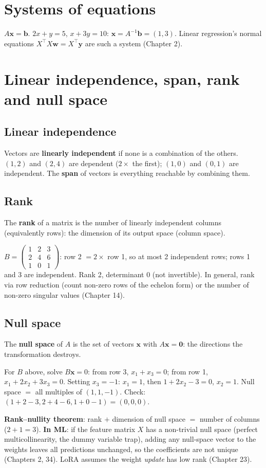 \section{Systems of equations}
$A\mathbf x = \mathbf b$. $2x + y = 5$, $x + 3y = 10$: $\mathbf x = A^{-1}\mathbf b = (1, 3)$. Linear regression's normal equations $X^\top X\mathbf w = X^\top\mathbf y$ are such a system
(Chapter 2).

\section{Linear independence, span, rank and null space}
\subsection{Linear independence}
Vectors are \textbf{linearly independent} if none is a combination of the others. $(1,2)$ and $(2,4)$ are dependent ($2\times$ the first); $(1,0)$ and $(0,1)$ are independent.
The \textbf{span} of vectors is everything reachable by combining them.

\subsection{Rank}
The \textbf{rank} of a matrix is the number of linearly independent columns (equivalently rows): the dimension of its output space (column space).
\begin{example}
$B = \begin{pmatrix}1 & 2 & 3\\2 & 4 & 6\\1 & 0 & 1\end{pmatrix}$: row 2 $= 2\times$ row 1, so at most 2 independent rows; rows 1 and 3 are independent. Rank 2,
determinant 0 (not invertible). In general, rank via row reduction (count non-zero rows of the echelon form) or the number of non-zero singular values (Chapter 14).
\end{example}

\subsection{Null space}
The \textbf{null space} of $A$ is the set of vectors $\mathbf x$ with $A\mathbf x = \mathbf 0$: the directions the transformation destroys.
\begin{example}
For $B$ above, solve $B\mathbf x = 0$: from row 3, $x_1 + x_3 = 0$; from row 1, $x_1 + 2x_2 + 3x_3 = 0$. Setting $x_3 = -1$: $x_1 = 1$, then $1 + 2x_2 - 3 = 0$, $x_2 = 1$.
Null space $=$ all multiples of $(1, 1, -1)$. Check: $(1 + 2 - 3, 2 + 4 - 6, 1 + 0 - 1) = (0,0,0)$.
\end{example}
\textbf{Rank--nullity theorem}: rank $+$ dimension of null space $=$ number of columns ($2 + 1 = 3$).
\textbf{In ML}: if the feature matrix $X$ has a non-trivial null space (perfect multicollinearity, the dummy variable trap), adding any null-space vector to the weights leaves all
predictions unchanged, so the coefficients are not unique (Chapters 2, 34). LoRA assumes the weight \emph{update} has low rank (Chapter 23).

